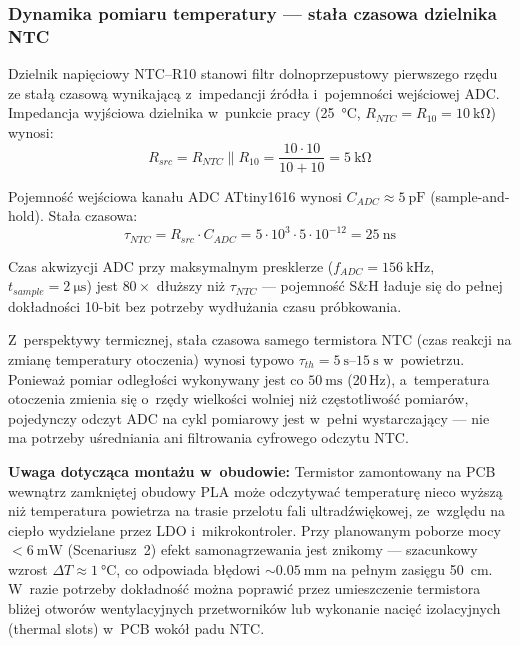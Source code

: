 \documentclass[a4paper,11pt]{article}
\begin{document}
	\subsubsection{Dynamika pomiaru temperatury --- stała czasowa dzielnika NTC}
	\label{sec:ntc_dynamics}
	
	Dzielnik napięciowy NTC--R10 stanowi filtr dolnoprzepustowy pierwszego rzędu
	ze stałą czasową wynikającą z~impedancji źródła i~pojemności wejściowej ADC.
	Impedancja wyjściowa dzielnika w~punkcie pracy (\SI{25}{\celsius}, $R_{NTC}
	= R_{10} = \SI{10}{\kilo\ohm}$) wynosi:
	\begin{equation}
		R_{src} = R_{NTC} \| R_{10} = \frac{10 \cdot 10}{10 + 10} = \SI{5}{\kilo\ohm}
		\label{eq:ntc_rsrc}
	\end{equation}
	
	Pojemność wejściowa kanału ADC ATtiny1616 wynosi $C_{ADC} \approx
	\SI{5}{\pico\farad}$ (sample-and-hold). Stała czasowa:
	\begin{equation}
		\tau_{NTC} = R_{src} \cdot C_{ADC} = 5 \cdot 10^{3} \cdot 5 \cdot 10^{-12}
		= \SI{25}{\nano\second}
		\label{eq:ntc_tau}
	\end{equation}
	
	Czas akwizycji ADC przy maksymalnym presklerze ($f_{ADC} =
	\SI{156}{\kilo\hertz}$, $t_{sample} = \SI{2}{\micro\second}$) jest
	$80\times$ dłuższy niż $\tau_{NTC}$ --- pojemność S\&H ładuje się
	do pełnej dokładności 10-bit bez potrzeby wydłużania czasu próbkowania.
	
	Z~perspektywy termicznej, stała czasowa samego termistora NTC
	(czas reakcji na zmianę temperatury otoczenia) wynosi typowo
	$\tau_{th} = \SIrange{5}{15}{\second}$ w~powietrzu. Ponieważ pomiar
	odległości wykonywany jest co $\SI{50}{\milli\second}$ (20\,Hz),
	a~temperatura otoczenia zmienia się o~rzędy wielkości wolniej niż
	częstotliwość pomiarów, pojedynczy odczyt ADC na cykl pomiarowy jest
	w~pełni wystarczający --- nie ma potrzeby uśredniania ani filtrowania
	cyfrowego odczytu NTC.
	
	\textbf{Uwaga dotycząca montażu w~obudowie:} Termistor zamontowany na PCB
	wewnątrz zamkniętej obudowy PLA może odczytywać temperaturę nieco wyższą
	niż temperatura powietrza na trasie przelotu fali ultradźwiękowej,
	ze~względu na ciepło wydzielane przez LDO i~mikrokontroler.
	Przy planowanym poborze mocy ${<}\SI{6}{\milli\watt}$ (Scenariusz~2)
	efekt samonagrzewania jest znikomy --- szacunkowy wzrost $\Delta T
	\approx \SI{1}{\celsius}$, co odpowiada błędowi ${\sim}\SI{0,05}{\milli\metre}$
	na pełnym zasięgu \SI{50}{\centi\metre}.
	W~razie potrzeby dokładność można poprawić przez umieszczenie termistora
	bliżej otworów wentylacyjnych przetworników lub wykonanie nacięć
	izolacyjnych (thermal slots) w~PCB wokół padu NTC.
	
\end{document}
